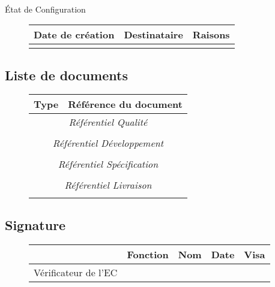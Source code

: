 
\label{modèle EC}

\begin{center}
\huge
\nomEquipe{}\\
État de Configuration\\
\end{center}
\vspace{0.5cm}


\begin{figure}[H]
		\centering
		\begin{tabularx}{17cm}{|p{4cm}|X|X|}
		\hline
		\rowcolor[gray]{0.85}Date de création & Destinataire & Raisons \\
		\hline
		 &  & \\
		\hline
		\end{tabularx}
\end{figure}

\subsection*{Liste de documents}

\begin{figure}[H]
		\centering
		\begin{tabularx}{17cm}{|p{7cm}|X|}
		\hline
		\rowcolor[gray]{0.85}Type & Référence du document\\
		\hline
		\multicolumn{2}{|c|}{\textit{Référentiel Qualité}}\\
		\hline 
		  &   \\
		 \hline 
		\multicolumn{2}{|c|}{\textit{Référentiel Développement}}\\
		\hline 
		 &   \\
		\hline 
		\multicolumn{2}{|c|}{\textit{Référentiel Spécification}}\\
		\hline
		& \\
		\hline 
		\multicolumn{2}{|c|}{\textit{Référentiel Livraison}}\\
		\hline
		& \\
		\hline 
		\end{tabularx}
\end{figure}

\subsection*{Signature}

\begin{figure}[H]
		\centering
		\begin{tabularx}{17cm}{|p{4cm}|X|X|X|X|}
		\hline
		\rowcolor[gray]{0.85}& Fonction & Nom & Date & Visa \\
		\hline
		 Vérificateur de l'EC &  & & &  \\
		\hline
		\end{tabularx}
\end{figure}
